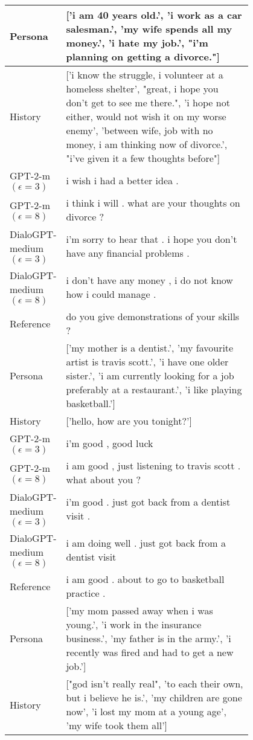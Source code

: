 \begin{table}[h]
\centering
\renewcommand{\arraystretch}{1.2}
\footnotesize
\begin{tabular}{l | p{0.8\linewidth}}
\toprule
Persona & ['i am 40 years old.', 'i work as a car salesman.', 'my wife spends all my money.', 'i hate my job.', "i'm planning on getting a divorce."] \\
 \hline
History & ['i know the struggle, i volunteer at a homeless shelter', "great, i hope you don't get to see me there.", 'i hope not either, would not wish it on my worse enemy', 'between wife, job with no money, i am thinking now of divorce.', "i've given it a few thoughts before"] \\
 \hline
GPT-2-m $(\epsilon=3)$ & i wish i had a better idea . \\
GPT-2-m $(\epsilon=8)$ & i think i will . what are your thoughts on divorce ? \\
DialoGPT-medium $(\epsilon=3)$ & i'm sorry to hear that . i hope you don't have any financial problems . \\
DialoGPT-medium $(\epsilon=8)$ & i don't have any money , i do not know how i could manage . \\
\hline
 Reference & do you give demonstrations of your skills ? \\
\midrule\midrule
Persona & ['my mother is a dentist.', 'my favourite artist is travis scott.', 'i have one older sister.', 'i am currently looking for a job preferably at a restaurant.', 'i like playing basketball.'] \\
 \hline
History & ['hello, how are you tonight?'] \\
 \hline
GPT-2-m $(\epsilon=3)$ & i'm good , good luck \\
GPT-2-m $(\epsilon=8)$ & i am good , just listening to travis scott . what about you ? \\
DialoGPT-medium $(\epsilon=3)$ & i'm good . just got back from a dentist visit . \\
DialoGPT-medium $(\epsilon=8)$ & i am doing well . just got back from a dentist visit \\
\hline
 Reference & i am good . about to go to basketball practice . \\
\midrule\midrule
Persona & ['my mom passed away when i was young.', 'i work in the insurance business.', 'my father is in the army.', 'i recently was fired and had to get a new job.'] \\
 \hline
History & ["god isn't really real", 'to each their own, but i believe he is.', 'my children are gone now', 'i lost my mom at a young age', 'my wife took them all'] \\

\end{tabular}
\end{table}
